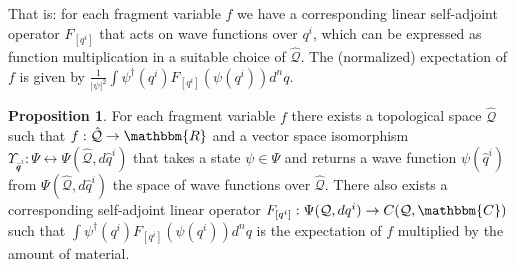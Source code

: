\documentclass[aps,pra,10pt,twocolumn,floatfix,nofootinbib]{revtex4-1}
\numberwithin{equation}{section}
\theoremstyle{definition}
\newtheorem{prop}[equation]{Proposition}
\begin{document}
That is: for each fragment variable $f$ we have a corresponding linear self-adjoint operator $F_{[q^i]}$ that acts on wave functions over $q^i$, which can be expressed as function multiplication in a suitable choice of $\hat{\mathcal{Q}}$. The (normalized) expectation of $f$ is given by $\frac{1}{|\psi|^2}\int \psi^\dagger(q^i) F_{[q^i]} (\psi(q^i)) d^nq$.

\begin{prop}\label{prop:self_adjoint_operators}
	For each fragment variable $f$ there exists a topological space $\hat{\mathcal{Q}}$ such that $f : \hat{\mathcal{Q}} \rightarrow \mathbbm{R}$ and a vector space isomorphism $\Upsilon_{\hat{\mathcal{q}}^i} : \Psi \leftrightarrow \Psi(\hat{\mathcal{Q}}, d\hat{q}^i)$ that takes a state $\psi \in \Psi$ and returns a wave function $\psi(\hat{q}^i)$ from $\Psi(\hat{\mathcal{Q}}, d\hat{q}^i)$ the space of wave functions over $\hat{\mathcal{Q}}$. There also exists a corresponding self-adjoint linear operator $F_{[q^i]} : \Psi(\mathcal{Q}, dq^i) \rightarrow C(\mathcal{Q}, \mathbbm{C})$ such that $\int \psi^\dagger(q^i) F_{[q^i]}( \psi(q^i))d^nq $ is the expectation of $f$ multiplied by the amount of material. 
\end{prop}
\end{document}
